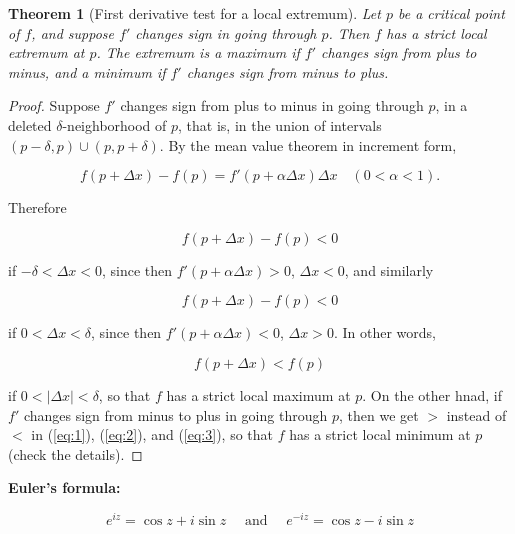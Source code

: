 \documentclass{article}
\newtheorem{theorem}{Theorem}
\begin{document}
\begin{theorem}[First derivative test for a local extremum]
Let $p$ be a critical point of $f$, and suppose $f'$ changes sign in going through $p$.   Then $f$ has a strict local extremum at $p$.  The extremum is a maximum if $f'$ changes sign from plus to minus, and a minimum if $f'$ changes sign from minus to plus.
\end{theorem}

\begin{proof}

Suppose $f'$ changes sign from plus to minus in going through 
$p$, in a deleted $\delta$-neighborhood of $p$, that is, in the 
union of intervals $(p-\delta, p) \cup (p, p+\delta)$.
By the mean value theorem in increment form,

\[ f(p + \Delta x) - f(p) = f'(p + \alpha \Delta x) \Delta x \quad (0 < \alpha < 1). \]

\noindent Therefore

\begin{equation}
\label{eq:1}
f(p + \Delta x) - f(p) < 0
\end{equation}

\noindent if $-\delta < \Delta x < 0$, since then $f'(p + \alpha \Delta x) > 0$, $\Delta x < 0$, and similarly

\begin{equation}
\label{eq:2}
f(p + \Delta x) - f(p) < 0
\end{equation}

\noindent if $0 < \Delta x < \delta$, since then $f'(p + \alpha \Delta x) < 0$, $\Delta x > 0$.  In other words,

\begin{equation}
\label{eq:3}
f(p + \Delta x) < f(p)
\end{equation}

\noindent if $0 < |\Delta x| < \delta$, so that $f$ has a strict local maximum
at $p$.  On the other hnad, if $f'$ changes sign from minus to plus in
going through $p$, then we get $>$ instead of $<$ in (\ref{eq:1}),
(\ref{eq:2}), and (\ref{eq:3}), so that $f$ has a strict local minimum
at $p$ (check the details).

\end{proof}

\newpage

\noindent \textbf{Euler's formula:}

\[ e^{iz} = \cos z + i \sin z \quad \mbox{ and } \quad e^{-iz} = \cos z - i \sin z \]

\newpage
\end{document}
